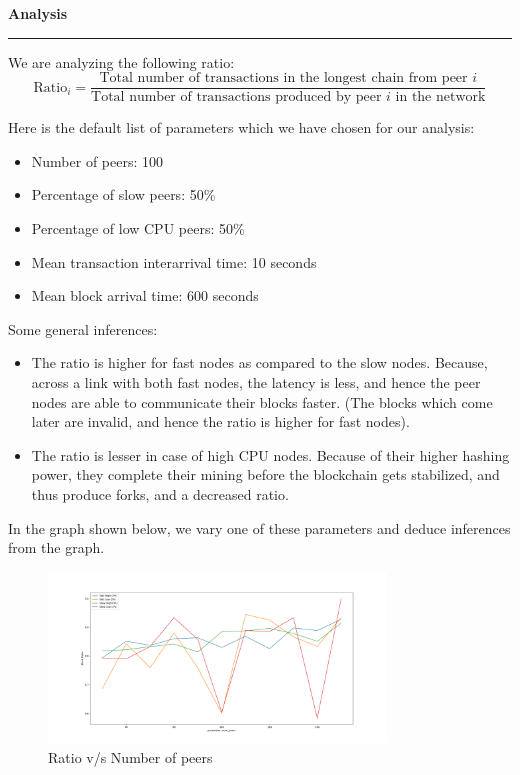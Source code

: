 \documentclass[a4paper,12pt]{article}
\newenvironment{solution}[2][]{%
\begin{mdframed}[linecolor=blue!70!black, linewidth=2pt, roundcorner=10pt, backgroundcolor=yellow!10!white, skipabove=12pt, skipbelow=12pt]%
	\textbf{\large #2}
	\par\noindent\rule{\textwidth}{0.4pt}
}{
\end{mdframed}
}
\begin{document}
\begin{solution}{Analysis}
	We are analyzing the following ratio:
	\begin{equation*}
		\text{Ratio$_i$} = \frac{\text{Total number of transactions in the longest chain from peer $i$}}{\text{Total number of transactions produced by peer $i$ in the network}}
	\end{equation*}

	Here is the default list of parameters which we have chosen for our analysis:
	\begin{itemize}
		\item Number of peers: 100
		\item Percentage of slow peers: 50\%
		\item Percentage of low CPU peers: 50\%
		\item Mean transaction interarrival time: 10 seconds
		\item Mean block arrival time: 600 seconds
	\end{itemize}

	Some general inferences:

	\begin{itemize}
		\item The ratio is higher for fast nodes as compared to the slow nodes. Because, across a link with both fast nodes, the latency is less, and hence the peer nodes are able to communicate their blocks faster. (The blocks which come later are invalid, and hence the ratio is higher for fast nodes).
		\item The ratio is lesser in case of high CPU nodes. Because of their higher hashing power, they complete their mining before the blockchain gets stabilized, and thus produce forks, and a decreased ratio.
	\end{itemize}

	In the graph shown below, we vary one of these parameters and deduce inferences from the graph.
	\begin{figure}[H]
		\centering
		\includegraphics[width=0.8\textwidth]{../images/avg_run_3/num_peers.png}
		\caption{Ratio v/s Number of peers}
		\label{fig:simulation_plot1}
	\end{figure}


\end{solution}
\end{document}
